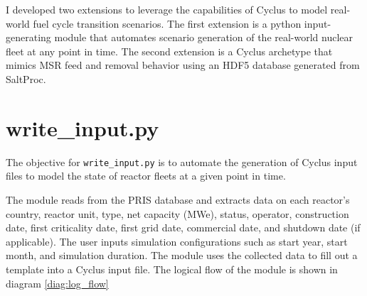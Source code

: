 I developed two extensions to leverage 
the capabilities of Cyclus to model
real-world fuel cycle transition scenarios.
The first extension is a python input-generating module
that automates scenario generation of the real-world 
nuclear fleet at any point in time. The second extension
is a Cyclus archetype that mimics \gls{MSR} feed and removal
behavior using an HDF5 database generated from SaltProc.

\section{write\_input.py}
\label{sec:writeinput}
The objective for \texttt{write\_input.py}
is to automate the generation of Cyclus input files
to model the state of reactor fleets at a given
point in time.

The module reads from the \gls{PRIS} database \cite{iaea_nuclear_2018}
and extracts data on each reactor's country, reactor unit,
type, net capacity (MWe), status, operator, construction date,
first criticality date, first grid date, commercial date,
and shutdown date (if applicable). The user inputs simulation
configurations such as start year, start month, and
simulation duration. The module uses the collected data to
fill out a template into a Cyclus input file. The logical flow of the module is 
shown in diagram \ref{diag:log_flow}


